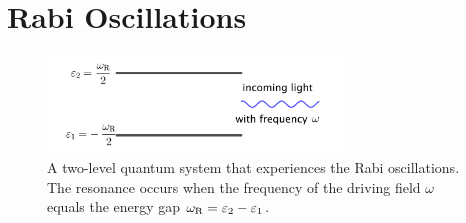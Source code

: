 


\section{\label{chap:app-sec:rabi-oscillations}Rabi Oscillations}

\begin{figure}[htbp]
    \centering
    \includegraphics[width=0.7\textwidth]{chapters/assets/matter/rabi-illustrative-diagram}
    \caption{A two-level quantum system that experiences the Rabi oscillations. The resonance occurs when the frequency of the driving field $\omega$ equals the energy gap $\omega_\mathrm R = \varepsilon_2 - \varepsilon_1$.}
    \label{chap:app-sec:rabi-oscillations-fig:rabi-diagram}
\end{figure}

